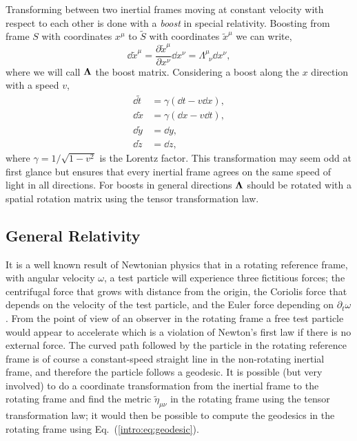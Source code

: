 Transforming between two inertial frames moving at constant velocity with respect to each other is done with a {\it boost} in special relativity. Boosting from frame $S$ with coordinates $x^\mu$ to $\tilde{S}$ with coordinates $\tilde{x}^\mu$ we can write, 
\begin{equation}
\dd \tilde{x}^\mu = \frac{\partial \tilde{x}^\mu}{\partial x^\nu} \dd x^\nu = \Lambda^\mu_{\,\,\,\nu} \dd x^\nu,
\end{equation}
where we will call $\boldsymbol{\Lambda}$ the boost matrix. Considering a boost along the $x$ direction with a speed $v$,
\begin{align}
\dd \tilde{t} &= \gamma (\dd t-v\dd x), \\ 
\dd \tilde{x} &= \gamma (\dd x-v\dd t), \\ 
\dd \tilde{y} &= \dd y, \\ 
\dd \tilde{z} &= \dd z,  
\end{align} 
where $\gamma = 1/\sqrt{1-v^2}$ is the Lorentz factor. This transformation may seem odd at first glance but ensures that every inertial frame agrees on the same speed of light in all directions. For boosts in general directions $\boldsymbol{\Lambda}$ should be rotated with a spatial rotation matrix using the tensor transformation law.



\subsection{General Relativity}

It is a well known result of Newtonian physics that in a rotating reference frame, with angular velocity $\omega$, a test particle will experience three fictitious forces; the centrifugal force that grows with distance from the origin, the Coriolis force that depends on the velocity of the test particle, and the Euler force depending on $\partial_t \omega$. From the point of view of an observer in the rotating frame a free test particle would appear to accelerate which is a violation of Newton's first law if there is no external force. The curved path followed by the particle in the rotating reference frame is of course a constant-speed straight line in the non-rotating inertial frame, and therefore the particle follows a geodesic. It is possible (but very involved) to do a coordinate transformation from the inertial frame to the rotating frame and find the metric $\tilde{\eta}_{\mu\nu}$ in the rotating frame using the tensor transformation law; it would then be possible to compute the geodesics in the rotating frame using Eq.~(\ref{intro:eq:geodesic}).

